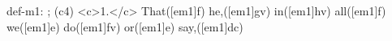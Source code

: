 def-m1: \grealign;
(c4) <c>1.</c> That([em1]f) he,([em1]gv) in([em1]hv) all([em1]f) we([em1]e) do([em1]fv) or([em1]e) say,([em1]dc)